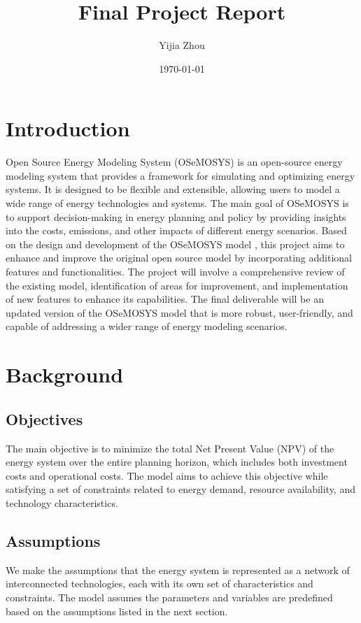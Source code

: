 \documentclass[11pt]{article}
\title{Final Project Report}
\author{Yijia Zhou}
\date{\today}
\begin{document}
\maketitle


\section{Introduction}
Open Source Energy Modeling System (OSeMOSYS) is an open-source energy modeling system that provides a framework for simulating and optimizing energy systems. It is designed to be flexible and extensible, allowing users to model a wide range of energy technologies and systems. The main goal of OSeMOSYS is to support decision-making in energy planning and policy by providing insights into the costs, emissions, and other impacts of different energy scenarios. Based on the design and development of the OSeMOSYS model \cite{Howells2011}, this project aims to enhance and improve the original open source model by incorporating additional features and functionalities. The project will involve a comprehensive review of the existing model, identification of areas for improvement, and implementation of new features to enhance its capabilities. The final deliverable will be an updated version of the OSeMOSYS model that is more robust, user-friendly, and capable of addressing a wider range of energy modeling scenarios.

\section{Background}
\subsection{Objectives}
The main objective is to minimize the total Net Present Value (NPV) of the energy system over the entire planning horizon, which includes both investment costs and operational costs. The model aims to achieve this objective while satisfying a set of constraints related to energy demand, resource availability, and technology characteristics.

\subsection{Assumptions}
We make the assumptions that the energy system is represented as a network of interconnected technologies, each with its own set of characteristics and constraints. The model assumes the parameters and variables are predefined based on the assumptions listed in the next section.
\end{document}
